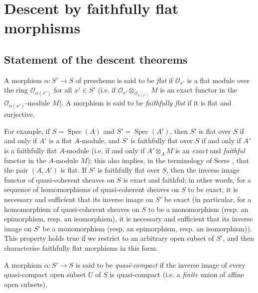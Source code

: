 \section{Descent by faithfully flat morphisms}\label{fga3.i-b}

\subsection{Statement of the descent theorems}\label{fga3.i-b.1}

\begin{definition}\label{fga3.i-b.1-definition-1.1}
    A morphism $\alpha\colon S'\to S$ of prescheme is said to be \emph{flat} if $\mathcal{O}_{x'}$ is a flat module over the ring $\mathcal{O}_{\alpha(x')}$ for all $x'\in S'$ (i.e. if $\mathcal{O}_{x'}\otimes_{\mathcal{O}_{\alpha(x')}}M$ is an exact functor in the $\mathcal{O}_{\alpha(x')}$-module $M$).
    A morphism is said to be \emph{faithfully flat} if it is flat and surjective.
\end{definition}

For example, if $S=\operatorname{Spec}(A)$ and $S'=\operatorname{Spec}(A')$, then $S'$ is flat over $S$ if and only if $A'$ is a flat $A$-module, and $S'$ is faithfully flat over $S$ if and only if $A'$ is a faithfully flat $A$-module (i.e. if and only if $A'\otimes_A M$ is an \emph{exact} and \emph{faithful} functor in the $A$-module $M$);
this also implies, in the terminology of Serre \cite{Ser1956}, that the pair $(A,A')$ is flat.
If $S'$ is faithfully flat over $S$, then the inverse image functor of quasi-coherent sheaves on $S$ is exact and faithful;
in other words, for a sequence of homomorphisms of quasi-coherent sheaves on $S$ to be exact, it is necessary and sufficient that its inverse image on $S'$ be exact (in particular, for a homomorphism of quasi-coherent sheaves on $S$ to be a monomorphism (resp. an epimorphism, resp. an isomorphism), it is necessary and sufficient that its inverse image on $S'$ be a monomorphism (resp. an epimorphism, resp. an isomorphism)).
This property holds true if we restrict to an arbitrary open subset of $S'$, and then characterise faithfully flat morphisms in this form.


\begin{definition}\label{fga3.i-b.1-definition-1.2}
    A morphism $\alpha\colon S'\to S$ is said to be \emph{quasi-compact} if the inverse image of every quasi-compact open subset $U$ of $S$ is quasi-compact (i.e. a \emph{finite} union of affine open subsets).
\end{definition}

